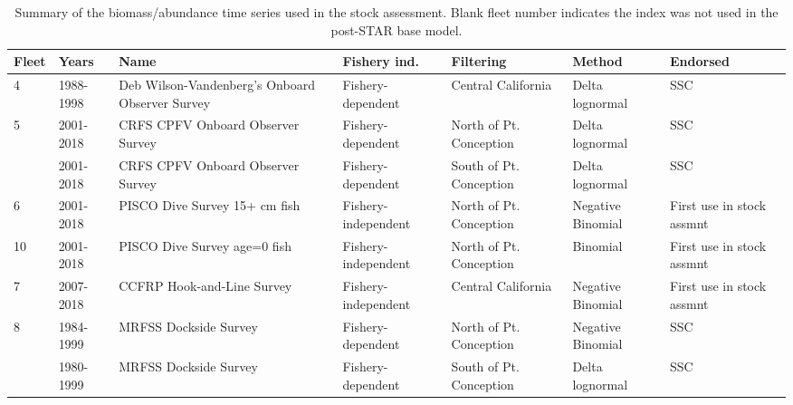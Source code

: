 \documentclass[12pt,]{article}
\begin{document}
\begin{landscape}
\begin{table}[ht]
\centering
\caption{Summary of the biomass/abundance
                                              time series used in the stock
                                              assessment. Blank fleet number indicates 
                                              the index was not used in the post-STAR base 
                                              model.} 
\label{tab:Index_summary}
\begin{tabular}{>{\raggedright}p{.8in}>{\raggedright}p{1in}>{\raggedright}p{2in}>{\raggedright}p{1.3in}>{\raggedright}p{1in}>{\raggedright}p{1in}>{\raggedright}p{1in}}
  \hline
Fleet & Years & Name & Fishery ind. & Filtering & Method & Endorsed \\ 
  \hline
4 & 1988-1998 & Deb Wilson-Vandenberg's Onboard Observer Survey & Fishery-dependent & Central California & Delta lognormal & SSC \\ 
  5 & 2001-2018 & CRFS CPFV Onboard Observer Survey & Fishery-dependent & North of Pt. Conception & Delta lognormal & SSC \\ 
   & 2001-2018 & CRFS CPFV Onboard Observer Survey & Fishery-dependent & South of Pt. Conception & Delta lognormal & SSC \\ 
  6 & 2001-2018 & PISCO Dive Survey 15+ cm fish & Fishery-independent & North of Pt. Conception & Negative Binomial & First use in stock assmnt \\ 
  10 & 2001-2018 & PISCO Dive Survey age=0 fish & Fishery-independent & North of Pt. Conception & Binomial & First use in stock assmnt \\ 
  7 & 2007-2018 & CCFRP Hook-and-Line Survey & Fishery-independent & Central California & Negative Binomial & First use in stock assmnt \\ 
  8 & 1984-1999 & MRFSS Dockside Survey & Fishery-dependent & North of Pt. Conception & Negative Binomial & SSC \\ 
   & 1980-1999 & MRFSS Dockside Survey & Fishery-dependent & South of Pt. Conception & Delta lognormal & SSC \\ 
   \hline
\end{tabular}
\end{table}
\end{landscape}

\FloatBarrier
\end{document}
